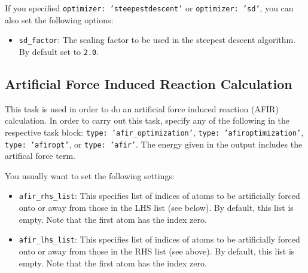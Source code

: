 \documentclass[]{tufte-book}
\begin{document}
If you specified \texttt{optimizer: 'steepestdescent'} or \texttt{optimizer: 'sd'}, you can also set the following options:
\begin{itemize}
\item \texttt{sd\_factor}: The scaling factor to be used in the steepest descent algorithm. By default set to \texttt{2.0}.
\end{itemize}

\subsection{Artificial Force Induced Reaction Calculation}

This task is used in order to do an artificial force induced reaction (AFIR\cite{afir1, afir2}) calculation. In
order to carry out this task, specify any of the following in the respective task block: \texttt{type: 'afir\_optimization'},
\texttt{type: 'afiroptimization'}, \texttt{type: 'afiropt'}, or \texttt{type: 'afir'}. The energy given in the output
includes the artifical force term.

You usually want to set the following settings:
\begin{itemize}
\item \texttt{afir\_rhs\_list}: This specifies list of indices of atoms to be artificially forced onto or away from those
in the LHS list (see below). By default, this list is empty. Note that the first atom has the index zero.
\item \texttt{afir\_lhs\_list}: This specifies list of indices of atoms to be artificially forced onto or away from those
in the RHS list (see above). By default, this list is empty. Note that the first atom has the index zero.
\end{itemize}
\end{document}
